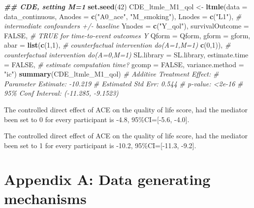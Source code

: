 \documentclass[
]{book}
\newenvironment{Shaded}{\begin{snugshade}}{\end{snugshade}}
\newcommand{\AttributeTok}[1]{\textcolor[rgb]{0.13,0.29,0.53}{#1}}
\newcommand{\CommentTok}[1]{\textcolor[rgb]{0.56,0.35,0.01}{\textit{#1}}}
\newcommand{\ConstantTok}[1]{\textcolor[rgb]{0.56,0.35,0.01}{#1}}
\newcommand{\DecValTok}[1]{\textcolor[rgb]{0.00,0.00,0.81}{#1}}
\newcommand{\DocumentationTok}[1]{\textcolor[rgb]{0.56,0.35,0.01}{\textbf{\textit{#1}}}}
\newcommand{\FunctionTok}[1]{\textcolor[rgb]{0.13,0.29,0.53}{\textbf{#1}}}
\newcommand{\NormalTok}[1]{#1}
\newcommand{\OtherTok}[1]{\textcolor[rgb]{0.56,0.35,0.01}{#1}}
\newcommand{\StringTok}[1]{\textcolor[rgb]{0.31,0.60,0.02}{#1}}
\begin{document}
\begin{Shaded}
\begin{Highlighting}[]
\DocumentationTok{\#\# CDE, setting M=1}
\FunctionTok{set.seed}\NormalTok{(}\DecValTok{42}\NormalTok{)}
\NormalTok{CDE\_ltmle\_M1\_qol }\OtherTok{\textless{}{-}} \FunctionTok{ltmle}\NormalTok{(}\AttributeTok{data =}\NormalTok{ data\_continuous,}
                          \AttributeTok{Anodes =} \FunctionTok{c}\NormalTok{(}\StringTok{"A0\_ace"}\NormalTok{, }\StringTok{"M\_smoking"}\NormalTok{),}
                          \AttributeTok{Lnodes =} \FunctionTok{c}\NormalTok{(}\StringTok{"L1"}\NormalTok{), }\CommentTok{\# intermediate confounders +/{-} baseline}
                          \AttributeTok{Ynodes =} \FunctionTok{c}\NormalTok{(}\StringTok{"Y\_qol"}\NormalTok{),}
                          \AttributeTok{survivalOutcome =} \ConstantTok{FALSE}\NormalTok{, }\CommentTok{\# TRUE for time{-}to{-}event outcomes Y}
                          \AttributeTok{Qform =}\NormalTok{ Qform,}
                          \AttributeTok{gform =}\NormalTok{ gform,}
                          \AttributeTok{abar =} \FunctionTok{list}\NormalTok{(}\FunctionTok{c}\NormalTok{(}\DecValTok{1}\NormalTok{,}\DecValTok{1}\NormalTok{), }\CommentTok{\# counterfactual intervention do(A=1,M=1)}
                                      \FunctionTok{c}\NormalTok{(}\DecValTok{0}\NormalTok{,}\DecValTok{1}\NormalTok{)), }\CommentTok{\# counterfactual intervention do(A=0,M=1)}
                          \AttributeTok{SL.library =}\NormalTok{ SL.library,}
                          \AttributeTok{estimate.time =} \ConstantTok{FALSE}\NormalTok{, }\CommentTok{\# estimate computation time?}
                          \AttributeTok{gcomp =} \ConstantTok{FALSE}\NormalTok{,}
                          \AttributeTok{variance.method =} \StringTok{"ic"}\NormalTok{)}
\FunctionTok{summary}\NormalTok{(CDE\_ltmle\_M1\_qol)}
\CommentTok{\# Additive Treatment Effect:}
\CommentTok{\#   Parameter Estimate:  {-}10.219}
\CommentTok{\#    Estimated Std Err:  0.544}
\CommentTok{\#              p{-}value:  \textless{}2e{-}16}
\CommentTok{\#    95\% Conf Interval: ({-}11.285, {-}9.1523)}
\end{Highlighting}
\end{Shaded}

The controlled direct effect of ACE on the quality of life score, had the mediator been set to 0 for every participant is -4.8, 95\%CI={[}-5.6, -4.0{]}.

The controlled direct effect of ACE on the quality of life score, had the mediator been set to 1 for every participant is -10.2, 95\%CI={[}-11.3, -9.2{]}.

\hypertarget{appendix_a}{%
\chapter{Appendix A: Data generating mechanisms}\label{appendix_a}}
\end{document}

